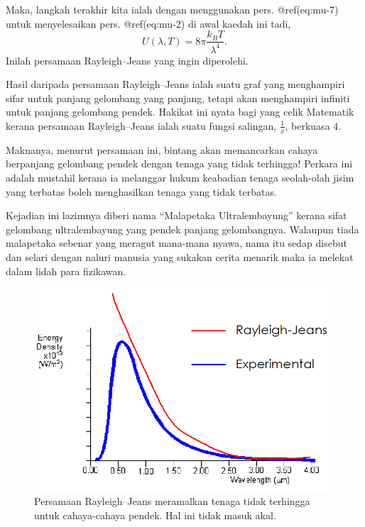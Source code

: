 \documentclass[
]{book}
\begin{document}
Maka, langkah terakhir kita ialah dengan menggunakan pers. @ref(eq:mu-7)
untuk menyelesaikan pers. @ref(eq:mu-2) di awal kaedah ini tadi,
\begin{equation}
U\left(\lambda,T\right) = 8\pi\frac{k_BT}{\lambda^4}.
\end{equation} Inilah persamaan Rayleigh--Jeans yang ingin diperolehi.

Hasil daripada persamaan Rayleigh--Jeans ialah suatu graf yang
menghampiri sifar untuk panjang gelombang yang panjang, tetapi akan
menghampiri infiniti untuk panjang gelombang pendek. Hakikat ini nyata
bagi yang celik Matematik kerana persamaan Rayleigh--Jeans ialah suatu
fungsi salingan, \(\frac{1}{x}\), berkuasa 4.

Maknanya, menurut persamaan ini, bintang akan memancarkan cahaya
berpanjang gelombang pendek dengan tenaga yang tidak terhingga! Perkara
ini adalah mustahil kerana ia melanggar hukum keabadian tenaga
seolah-olah jisim yang terbatas boleh menghasilkan tenaga yang tidak
terbatas.

Kejadian ini lazimnya diberi nama ``Malapetaka Ultralembayung'' kerana
sifat gelombang ultralembayung yang pendek panjang gelombangnya.
Walaupun tiada malapetaka sebenar yang meragut mana-mana nyawa, nama itu
sedap disebut dan selari dengan naluri manusia yang sukakan cerita
menarik maka ia melekat dalam lidah para fizikawan.

\begin{figure}

{\centering \includegraphics[width=500px]{./gambar/ultra/Rayleigh} 

}

\caption{Persamaan Rayleigh--Jeans meramalkan tenaga tidak terhingga untuk cahaya-cahaya pendek. Hal ini tidak masuk akal.}\label{fig:unnamed-chunk-2}
\end{figure}
\end{document}
